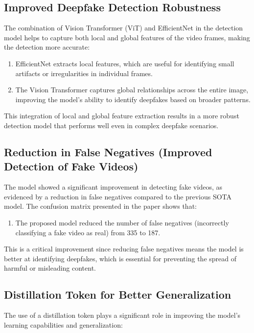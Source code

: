 \documentclass{report}
\begin{document}
	\subsection{Improved Deepfake Detection Robustness}
	The combination of Vision Transformer (ViT) and EfficientNet in the detection model helps to capture both local and global features of the video frames, making the detection more accurate:
	
	\begin{enumerate}
		\item 
		EfficientNet extracts local features, which are useful for identifying small artifacts or irregularities in individual frames.
		
		\item 
		The Vision Transformer captures global relationships across the entire image, improving the model's ability to identify deepfakes based on broader patterns.
	\end{enumerate}
	
	This integration of local and global feature extraction results in a more robust detection model that performs well even in complex deepfake scenarios.
	
	
	
	\subsection{Reduction in False Negatives (Improved Detection of Fake Videos)}
	The model showed a significant improvement in detecting fake videos, as evidenced by a reduction in false negatives compared to the previous SOTA model. The confusion matrix presented in the paper shows that:
	
	\begin{enumerate}
		\item 
		The proposed model reduced the number of false negatives (incorrectly classifying a fake video as real) from 335 to 187.
	\end{enumerate}
	
	This is a critical improvement since reducing false negatives means the model is better at identifying deepfakes, which is essential for preventing the spread of harmful or misleading content.
	
	
	
	\subsection{Distillation Token for Better Generalization}
	The use of a distillation token plays a significant role in improving the model's learning capabilities and generalization:
	
\end{document}
